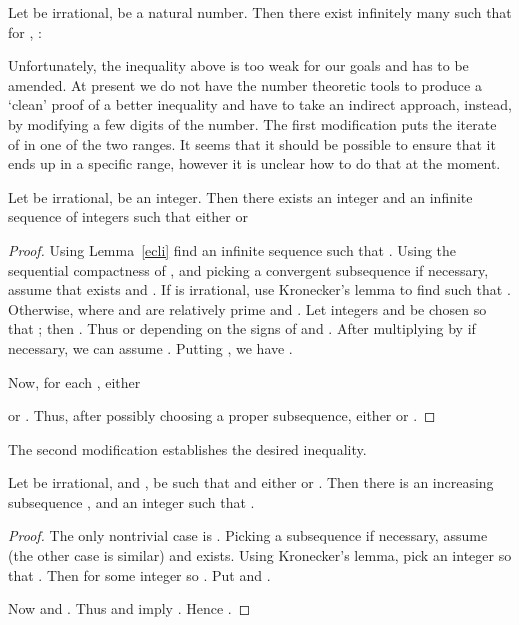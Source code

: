\documentclass[12pt]{article}
\begin{document}
\begin{lemma}\label{ecli}Let  be irrational,  be a
  natural number. Then there exist
  infinitely many  such that for ,
  :

\end{lemma}

Unfortunately, the inequality above is too weak for our goals and has
to be amended. At present we do not have the number theoretic tools to
produce a `clean' proof of a better inequality and have to take an
indirect approach, instead, by modifying a few digits of the number. The first
modification puts the iterate of  in one of the two ranges. It
seems that it should be possible to ensure that it ends up in a
specific range, however it is unclear how to do that at the moment.
 
\begin{lemma}\label{qrational}
Let  be irrational,  be an integer. Then there exists
an integer  and an infinite sequence  of
integers such that either 
 or

\end{lemma}
\begin{proof}
Using Lemma~\ref{ecli} find an infinite sequence  such that
. Using the
sequential compactness of , and picking a
convergent subsequence if necessary, assume that
 exists
and . If  is irrational, use Kronecker's
lemma to find  such that . Otherwise, 
where  and  are relatively prime and . Let integers  and
 be chosen so that ; then . Thus
 or  depending on the signs of  and
. After multiplying  by  if necessary, we can assume
. Putting , we have
. 

Now, for each , either

or
. Thus,
after possibly choosing a proper subsequence, either
 or
.
\end{proof}

The second modification establishes the desired inequality.
\begin{lemma}\label{normalize}
Let  be irrational,  and , 
be such that  and either  or
. Then there is an increasing
subsequence ,  and an integer  such
that
.
\end{lemma}
\begin{proof}
The only nontrivial case is
. Picking
a subsequence if necessary, assume  (the other case
is similar) and
 exists. Using Kronecker's lemma, pick an integer 
so that . Then 
for some integer  so .
Put  and
.

Now  and
.
Thus  and
 imply
. Hence
. 
\end{proof}
\end{document}
